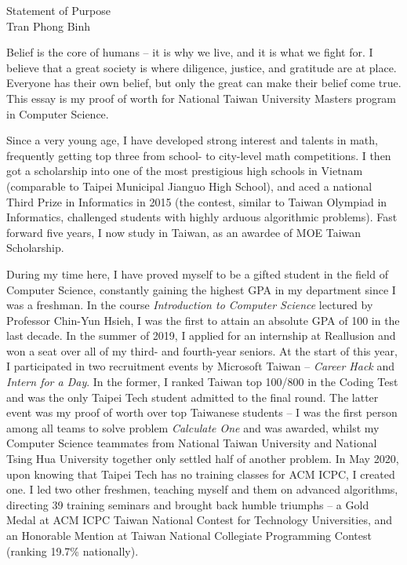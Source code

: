 \documentclass[letterpaper,12pt]{article}
\begin{document}
\begin{center}
{\Large Statement of Purpose} \\[.3in]
{\large Tran Phong Binh}
\end{center}

\vspace*{.5in}

Belief is the core of humans -- it is why we live, and it is what we fight for. I believe that a great society is where diligence, justice, and gratitude are at place.  Everyone has their own belief, but only the great can make their belief come true. This essay is my proof of worth for National Taiwan University Masters program in Computer Science.

Since a very young age, I have developed strong interest and talents in math, frequently getting top three from school- to city-level math competitions. I then got a scholarship into one of the most prestigious high schools in Vietnam (comparable to Taipei Municipal Jianguo High School), and aced a national Third Prize in Informatics in 2015 (the contest, similar to Taiwan Olympiad in Informatics, challenged students with highly arduous algorithmic problems). Fast forward five years, I now study in Taiwan, as an awardee of MOE Taiwan Scholarship.

During my time here, I have proved myself to be a gifted student in the field of Computer Science, constantly gaining the highest GPA in my department since I was a freshman. In the course \textit{Introduction to Computer Science} lectured by Professor Chin-Yun Hsieh, I was the first to attain an absolute GPA of 100 in the last decade. In the summer of 2019, I applied for an internship at Reallusion and won a seat over all of my third- and fourth-year seniors. At the start of this year, I participated in two recruitment events by Microsoft Taiwan -- \textit{Career Hack} and \textit{Intern for a Day}. In the former, I ranked Taiwan top 100/800 in the Coding Test and was the only Taipei Tech student admitted to the final round. The latter event was my proof of worth over top Taiwanese students -- I was the first person among all teams to solve problem \textit{Calculate One} and was awarded, whilst my Computer Science teammates from National Taiwan University and National Tsing Hua University together only settled half of another problem. In May 2020, upon knowing that Taipei Tech has no training classes for ACM ICPC, I created one. I led two other freshmen, teaching myself and them on advanced algorithms, directing 39 training seminars and brought back humble triumphs -- a Gold Medal at ACM ICPC Taiwan National Contest for Technology Universities, and an Honorable Mention at Taiwan National Collegiate Programming Contest (ranking 19.7\% nationally).
\end{document}
